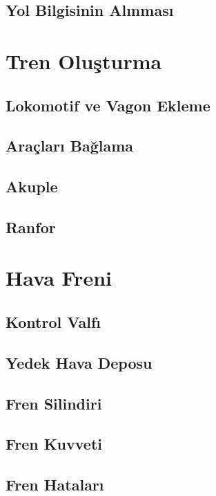 \documentclass[10pt,a4paper]{article}
\begin{document}
\subsection{Yol Bilgisinin Alınması}
\newpage

\section{Tren Oluşturma}

\subsection{Lokomotif ve Vagon Ekleme}

\subsection{Araçları Bağlama}

\subsection{Akuple}

\subsection{Ranfor}

\newpage
\section{Hava Freni}

\subsection{Kontrol Valfı}

\subsection{Yedek Hava Deposu}

\subsection{Fren Silindiri}

\subsection{Fren Kuvveti}

\subsection{Fren Hataları}
\end{document}
